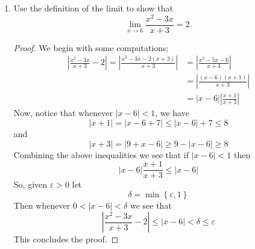 \documentclass[12pt, reqno]{article}
\numberwithin{equation}{section}
\theoremstyle{definition}
\theoremstyle{remark}
\newcommand{\set}[1]{\left\{#1\right\}}
\newcommand{\abs}[1]{\left\lvert#1\right\rvert}
\renewcommand{\epsilon}{\varepsilon}
\begin{document}
\begin{enumerate}[leftmargin=*]
	      \begin{proof}
		      We first notice that, for all $x$ such that $\abs{x-c}\leq1$, there holds
		      \begin{align*}
			      \abs{x^2 - c^2} = \abs{x-c}\abs{x+c}
			       & =\abs{x-c}\left(\abs{x-c+2c}\right)               \\
			       & \leq \abs{x-c}\left(\abs{x - c} + \abs{2c}\right) \\
			       & \leq \abs{x-c}\left(1 + 2\abs{c}\right)
		      \end{align*}
		      So, given $\epsilon > 0$ let
		      \[
			      \delta = \min\set{1, \frac{\epsilon}{1+2\abs{c}}}
		      \]
		      Then for all $x$ satisfying $0<\abs{x-c} < \delta$ we see that
		      \[
			      \abs{x^2 - c^2} \leq \abs{x-c}\left(1 + 2\abs{c}\right) < \delta\left(1 + 2\abs{c}\right) \leq \epsilon
		      \]
		      By definition, this means that $x^2 \to c^2$.

		      We know prove the same result with the sequential criterion. To this end, let $(x_n)$ be an arbitrary sequence converging to $c$. By class results, we know that $x_n^2 = x_n \cdot x_n \to c^2$. This concludes the proof.
	      \end{proof}

	\item Use the definition of the limit to show that
	      \[
		      \lim_{x\to 6}\frac{x^2-3x}{x+3} = 2.
	      \]

	      \begin{proof}
		      We begin with some computations;
		      \begin{align*}
			      \abs{\frac{x^2-3x}{x+3} - 2}
			      =\abs{\frac{x^2-3x - 2(x+3)}{x+3}}
			       & =\abs{\frac{x^2-5x-6}{x+3}}     \\
			       & =\abs{\frac{(x-6)(x+1)}{x+3}}   \\
			       & =\abs{x-6}\abs{\frac{x+1}{x+3}}
		      \end{align*}
		      Now, notice that whenever $\abs{x-6} < 1$, we have
		      \[
			      \abs{x+1} = \abs{x-6 + 7} \leq \abs{x-6} + 7 \leq 8
		      \]
		      and
		      \[
			      \abs{x+3} = \abs{9+x-6}\geq 9 -\abs{x-6} \geq 8
		      \]
		      Combining the above inequalities we see that if $\abs{x-6} < 1$ then
		      \[
			      \abs{x-6}\frac{x+1}{x+3} \leq \abs{x-6}
		      \]
		      So, given $\epsilon>0$ let
		      \[
			      \delta = \min\set{\epsilon, 1}
		      \]
		      Then whenever $0<\abs{x-6}<\delta$ we see that
		      \[
			      \abs{\frac{x^2-3x}{x+3} - 2} \leq \abs{x-6} < \delta \leq \epsilon
		      \]
		      This concludes the proof.
	      \end{proof}


\end{enumerate}
\end{document}
